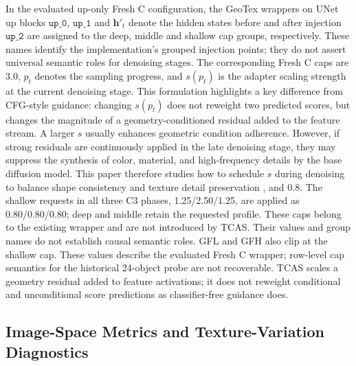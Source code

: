 \documentclass[times,twocolumn,final]{elsarticle}
\providecommand{\DIFadd}[1]{{\protect\color{blue} \sf #1}} %
\providecommand{\DIFdel}[1]{{\protect\color{red} \scriptsize #1}} %
\providecommand{\DIFaddbegin}{} %
\providecommand{\DIFaddend}{} %
\providecommand{\DIFdelbegin}{} %
\providecommand{\DIFdelend}{} %
\begin{document}
\DIFadd{In the evaluated up-only Fresh C configuration, the GeoTex wrappers on UNet up blocks $\texttt{up\_0}$, $\texttt{up\_1}$ }\DIFaddend and \DIFdelbegin \DIFdel{$\mathbf{h}'_t$ denote the hidden states before and after injection }\DIFdelend \DIFaddbegin \DIFadd{$\texttt{up\_2}$ are assigned to the deep, middle and shallow cap groups, respectively. These names identify the implementation's grouped injection points; they do not assert universal semantic roles for denoising stages. The corresponding Fresh C caps are 3.0}\DIFaddend , \DIFdelbegin \DIFdel{$p_t$ denotes the sampling progress, and $s(p_t)$ is the adapter scaling strength at the current denoising stage. This formulation highlights a key difference from CFG-style guidance: changing $s(p_t)$ does not reweight two predicted scores, but changes the magnitude of a geometry-conditioned residual added to the feature stream. A larger $s$ usually enhances geometric condition adherence. However, if strong residuals are continuously applied in the late denoising stage, they may suppress the synthesis of color, material, and high-frequency details by the base diffusion model. This paper therefore studies how to schedule $s$ during denoising to balance shape consistency and texture detail preservation}\DIFdelend \DIFaddbegin \DIFadd{3.5, and 0.8. The shallow requests in all three C3 phases, 1.25/2.50/1.25, are applied as 0.80/0.80/0.80; deep and middle retain the requested profile. These caps belong to the existing wrapper and are not introduced by TCAS. Their values and group names do not establish causal semantic roles. GFL and GFH also clip at the shallow cap. These values describe the evaluated Fresh C wrapper; row-level cap semantics for the historical 24-object probe are not recoverable. TCAS scales a geometry residual added to feature activations; it does not reweight conditional and unconditional score predictions as classifier-free guidance does}\DIFaddend .

\DIFdelbegin %
\DIFdelend \DIFaddbegin \subsection{Image-Space Metrics and Texture-Variation Diagnostics}
\DIFaddend \label{subsec:metrics}
\end{document}
